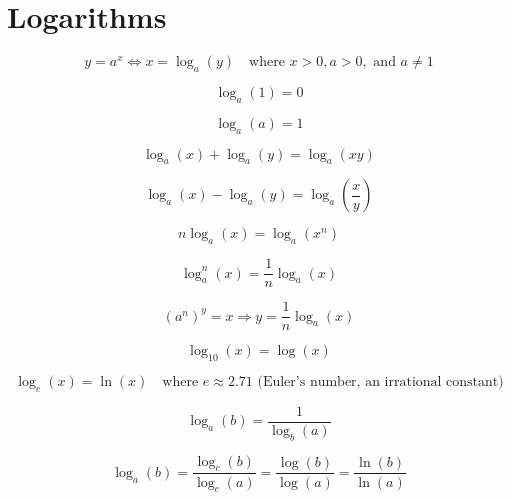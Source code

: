 \documentclass{article}
\begin{document}
\section{Logarithms}

\begin{equation}
y = a^x \iff x = \log_a(y) \quad \text{where } x > 0, a > 0, \text{ and } a \neq 1
\end{equation}

\begin{equation}
\log_a(1) = 0
\end{equation}

\begin{equation}
\log_a(a) = 1
\end{equation}

\begin{equation}
\log_a(x) + \log_a(y) = \log_a(xy)
\end{equation}

\begin{equation}
\log_a(x) - \log_a(y) = \log_a\left(\frac{x}{y}\right)
\end{equation}

\begin{equation}
n \log_a(x) = \log_a(x^n)
\end{equation}

\begin{equation}
\log_a^n(x) = \frac{1}{n} \log_a(x)
\end{equation}

\begin{equation}
(a^n)^y = x \Rightarrow y = \frac{1}{n} \log_a(x)
\end{equation}

\begin{equation}
\log_{10}(x) = \log(x)
\end{equation}

\begin{equation}
\log_{e}(x) = \ln(x) \quad \text{where } e \approx 2.71 \text{ (Euler's number, an irrational constant)}
\end{equation}

\begin{equation}
\log_a(b) = \frac{1}{\log_b(a)}
\end{equation}

\begin{equation}
\log_a(b) = \frac{\log_c(b)}{\log_c(a)} = \frac{\log(b)}{\log(a)} = \frac{\ln(b)}{\ln(a)}
\end{equation}
\end{document}
